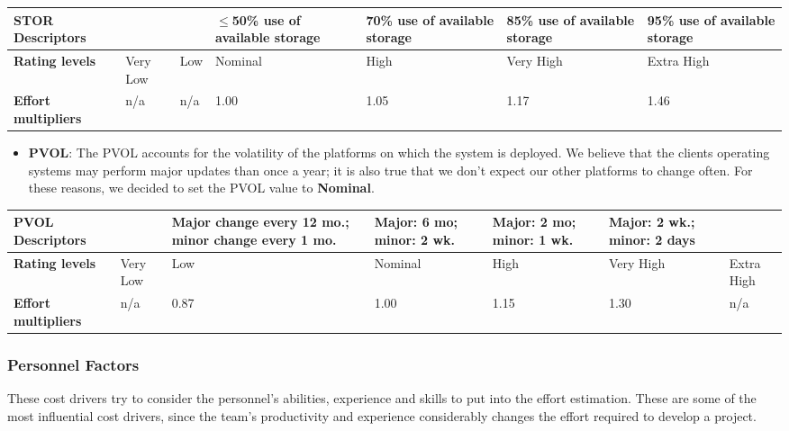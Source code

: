 		\begin{center}
			\begin{tabular}{ | C{2cm} | C{2cm} | C{2cm} | C{2cm} | C{2cm} | C{2cm} | C{2cm} | }
				\hline
				\textbf{STOR Descriptors} & & & $\leq$50\% use of available storage & 70\% use of available storage & 85\% use of available storage & 95\% use of available storage\\ \hline
			
				\textbf{Rating levels} & Very Low & Low & Nominal & High & Very High & Extra High\\ \hline
			
				\textbf{Effort multipliers} & n/a & n/a & 1.00 & 1.05 & 1.17 & 1.46\\ \hline
			\end{tabular}
		\end{center}
		
		
		
		
		\begin{itemize}
			\item \textbf{PVOL}: The PVOL accounts for the volatility of the platforms on which the system is deployed. We believe that the clients operating systems may perform major updates than once a year; it is also true that we don't expect our other platforms to change often. For these reasons, we decided to set the PVOL value to \textbf{Nominal}.
		\end{itemize}
		
		\begin{center}
			\begin{tabular}{ | C{2cm} | C{2cm} | C{2cm} | C{2cm} | C{2cm} | C{2cm} | C{2cm} | }
				\hline
				\textbf{PVOL Descriptors} & & Major change every 12 mo.; minor change every 1 mo. & Major: 6 mo; minor: 2 wk. & Major: 2 mo; minor: 1 wk. & Major: 2 wk.; minor: 2 days & \\ \hline
			
				\textbf{Rating levels} & Very Low & Low & Nominal & High & Very High & Extra High\\ \hline
			
				\textbf{Effort multipliers} & n/a & 0.87 & 1.00 & 1.15 & 1.30 & n/a\\ \hline
			\end{tabular}
		\end{center}
		
		
	
	\subsubsection*{Personnel Factors}
	These cost drivers try to consider the personnel's abilities, experience and skills to put into the effort estimation. These are some of the most influential cost drivers, since the team's productivity and experience considerably changes the effort required to develop a project. 
	
